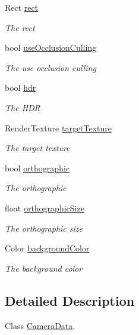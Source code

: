 \begin{DoxyCompactItemize}
Rect \hyperlink{class_serialize_camera_1_1_camera_data_ad93a6b0b6ed3a2dd54ad408a0618d397}{rect}
\begin{DoxyCompactList}\small\item\em The rect \end{DoxyCompactList}\item 
bool \hyperlink{class_serialize_camera_1_1_camera_data_a7b60a827f405d9fe8f5a267400ef0dee}{use\+Occlusion\+Culling}
\begin{DoxyCompactList}\small\item\em The use occlusion culling \end{DoxyCompactList}\item 
bool \hyperlink{class_serialize_camera_1_1_camera_data_af3b1d7fdb89139a360d9454cb8629d48}{hdr}
\begin{DoxyCompactList}\small\item\em The H\+DR \end{DoxyCompactList}\item 
Render\+Texture \hyperlink{class_serialize_camera_1_1_camera_data_a548c707699a0015c646fe245ae046122}{target\+Texture}
\begin{DoxyCompactList}\small\item\em The target texture \end{DoxyCompactList}\item 
bool \hyperlink{class_serialize_camera_1_1_camera_data_a1a0ff5e10ef8c24a8e6bbe7962ab8e6b}{orthographic}
\begin{DoxyCompactList}\small\item\em The orthographic \end{DoxyCompactList}\item 
float \hyperlink{class_serialize_camera_1_1_camera_data_a107afdda2d3d25ac4034c7c64a7bb1f4}{orthographic\+Size}
\begin{DoxyCompactList}\small\item\em The orthographic size \end{DoxyCompactList}\item 
Color \hyperlink{class_serialize_camera_1_1_camera_data_ae1e1fae64d7cb9fd321261cfcd1b1acf}{background\+Color}
\begin{DoxyCompactList}\small\item\em The background color \end{DoxyCompactList}\end{DoxyCompactItemize}


\subsection{Detailed Description}
Class \hyperlink{class_serialize_camera_1_1_camera_data}{Camera\+Data}. 



